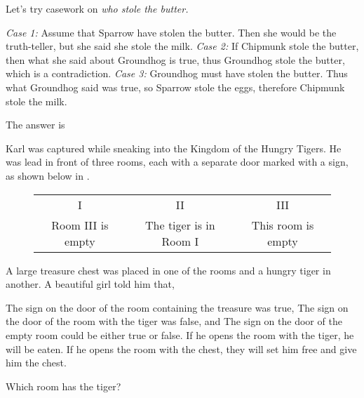 \documentclass{article}
\begin{document}
\begin{soln} 
    Let's try casework on \textit{who stole the butter.}
    \begin{itemize}[topsep=0pt, partopsep=0pt, itemsep=0pt]
        \ii \textit{Case 1:} Assume that Sparrow have stolen the butter. 
        Then she would be the truth-teller, but she said she stole the milk.
        \ii \textit{Case 2:} If Chipmunk stole the butter, then what she said about Groundhog is true,
        thus Groundhog stole the butter, which is a contradiction.
        \ii \textit{Case 3:} Groundhog must have stolen the butter. 
        Thus what Groundhog said was true, so Sparrow stole the eggs, therefore Chipmunk stole the milk.
    \end{itemize}    
    The answer is 
\end{soln}

\bigbreak

\begin{exercise*}
    \label{exercise:pi-2022-4-p9}
    Karl was captured while sneaking into the Kingdom of the Hungry Tigers.
    He was lead in front of three rooms, each with a separate door marked with a sign,
    as shown below in .
    \begin{figure}[h]
        \centering
        \begin{tabular}{|c|c|c|}
        \hline
        I & II & III \\
        Room III is empty & The tiger is in Room I & This room is empty \\ \hline
        \end{tabular}
        \caption{}
        \label{fig:pi-2022-4-p9}
    \end{figure}
    A large treasure chest was placed in one of the rooms and a hungry tiger in another.
    A beautiful girl told him that,
    \begin{enumerate}[topsep=0pt, partopsep=0pt, itemsep=0pt]
        \ii The sign on the door of the room containing the treasure was true,
        \ii The sign on the door of the room with the tiger was false, and
        \ii The sign on the door of the empty room could be either true or false.
        \ii If he opens the room with the tiger, he will be eaten.
        \ii If he opens the room with the chest, they will set him free and give him the chest.
    \end{enumerate}

    Which room has the tiger?
\end{exercise*}
\end{document}
